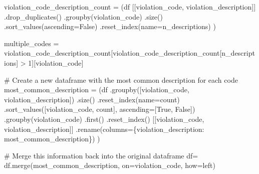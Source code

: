\documentclass[
  letterpaper,
  DIV=11,
  numbers=noendperiod]{scrartcl}
\newenvironment{Shaded}{\begin{snugshade}}{\end{snugshade}}
\newcommand{\CommentTok}[1]{\textcolor[rgb]{0.37,0.37,0.37}{#1}}
\newcommand{\DecValTok}[1]{\textcolor[rgb]{0.68,0.00,0.00}{#1}}
\newcommand{\NormalTok}[1]{\textcolor[rgb]{0.00,0.23,0.31}{#1}}
\newcommand{\OperatorTok}[1]{\textcolor[rgb]{0.37,0.37,0.37}{#1}}
\newcommand{\StringTok}[1]{\textcolor[rgb]{0.13,0.47,0.30}{#1}}
\newcommand{\VariableTok}[1]{\textcolor[rgb]{0.07,0.07,0.07}{#1}}
\begin{document}
\begin{Shaded}
\begin{Highlighting}[]
\NormalTok{violation\_code\_description\_count }\OperatorTok{=}\NormalTok{ (df}
\NormalTok{[[}\StringTok{\textquotesingle{}violation\_code\textquotesingle{}}\NormalTok{, }\StringTok{\textquotesingle{}violation\_description\textquotesingle{}}\NormalTok{]] }
\NormalTok{.drop\_duplicates()}
\NormalTok{.groupby(}\StringTok{\textquotesingle{}violation\_code\textquotesingle{}}\NormalTok{)}
\NormalTok{.size()}
\NormalTok{.sort\_values(ascending}\OperatorTok{=}\VariableTok{False}\NormalTok{)}
\NormalTok{.reset\_index(name}\OperatorTok{=}\StringTok{\textquotesingle{}n\_descriptions\textquotesingle{}}\NormalTok{)}
\NormalTok{)}

\NormalTok{multiple\_codes }\OperatorTok{=}\NormalTok{ violation\_code\_description\_count[violation\_code\_description\_count[}\StringTok{\textquotesingle{}n\_descriptions\textquotesingle{}}\NormalTok{] }\OperatorTok{\textgreater{}} \DecValTok{1}\NormalTok{][}\StringTok{\textquotesingle{}violation\_code\textquotesingle{}}\NormalTok{]}

\CommentTok{\# Create a new dataframe with the most common description for each code}
\NormalTok{most\_common\_description }\OperatorTok{=}\NormalTok{ (df}
\NormalTok{    .groupby([}\StringTok{\textquotesingle{}violation\_code\textquotesingle{}}\NormalTok{, }\StringTok{\textquotesingle{}violation\_description\textquotesingle{}}\NormalTok{])}
\NormalTok{    .size()}
\NormalTok{    .reset\_index(name}\OperatorTok{=}\StringTok{\textquotesingle{}count\textquotesingle{}}\NormalTok{)}
\NormalTok{    .sort\_values([}\StringTok{\textquotesingle{}violation\_code\textquotesingle{}}\NormalTok{, }\StringTok{\textquotesingle{}count\textquotesingle{}}\NormalTok{], ascending}\OperatorTok{=}\NormalTok{[}\VariableTok{True}\NormalTok{, }\VariableTok{False}\NormalTok{])}
\NormalTok{    .groupby(}\StringTok{\textquotesingle{}violation\_code\textquotesingle{}}\NormalTok{)}
\NormalTok{    .first()}
\NormalTok{    .reset\_index()}
\NormalTok{    [[}\StringTok{\textquotesingle{}violation\_code\textquotesingle{}}\NormalTok{, }\StringTok{\textquotesingle{}violation\_description\textquotesingle{}}\NormalTok{]]}
\NormalTok{    .rename(columns}\OperatorTok{=}\NormalTok{\{}\StringTok{\textquotesingle{}violation\_description\textquotesingle{}}\NormalTok{: }\StringTok{\textquotesingle{}most\_common\_description\textquotesingle{}}\NormalTok{\})}
\NormalTok{)}

\CommentTok{\# Merge this information back into the original dataframe}
\NormalTok{df}\OperatorTok{=}\NormalTok{ df.merge(most\_common\_description, on}\OperatorTok{=}\StringTok{\textquotesingle{}violation\_code\textquotesingle{}}\NormalTok{, how}\OperatorTok{=}\StringTok{\textquotesingle{}left\textquotesingle{}}\NormalTok{)}



\end{Highlighting}
\end{Shaded}
\end{document}
